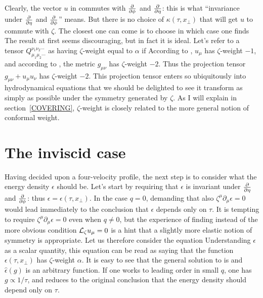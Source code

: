 \documentclass[12pt]{article}
\def\arctanh{\mop{arctanh}}
\begin{document}
Clearly, the vector $u$ in  commutes with ${\partial \over \partial\phi}$ and ${\partial \over \partial\eta}$: this is what ``invariance under ${\partial \over \partial\eta}$ and ${\partial \over \partial\phi}$'' means.  But there is no choice of $\kappa(\tau,x_\perp)$ that will get $u$ to commute with $\zeta$.  The closest one can come is to choose
 \eqn{kappaChoice}{
  \kappa = \arctanh {2q^2 \tau x_\perp \over 1 + q^2 \tau^2 + q^2 x_\perp^2} \,,
 }
in which case one finds
The result  at first seems discouraging, but in fact it is ideal.  Let's refer to a tensor $Q_{\mu_1\mu_2\cdots}^{\nu_1\nu_2\cdots}$ as having $\zeta$-weight equal to $\alpha$ if
According to , $u_\mu$ has $\zeta$-weight $-1$, and according to , the metric $g_{\mu\nu}$ has $\zeta$-weight $-2$.  Thus the projection tensor $g_{\mu\nu} + u_\mu u_\nu$ has $\zeta$-weight $-2$.  This projection tensor enters so ubiquitously into hydrodynamical equations that we should be delighted to see it transform as simply as possible under the symmetry generated by $\zeta$.  As I will explain in section~\ref{COVERING}, $\zeta$-weight is closely related to the more general notion of conformal weight.



\section{The inviscid case}
\label{INVISCID}

Having decided upon a four-velocity profile, the next step is to consider what the energy density $\epsilon$ should be.  Let's start by requiring that $\epsilon$ is invariant under ${\partial \over \partial\eta}$ and ${\partial \over \partial\phi}$: thus $\epsilon = \epsilon(\tau,x_\perp)$.  In the case $q=0$, demanding that also $\zeta^\mu \partial_\mu \epsilon = 0$ would lead immediately to the conclusion that $\epsilon$ depends only on $\tau$.  It is tempting to require $\zeta^\mu \partial_\mu \epsilon = 0$ even when $q \neq 0$, but the experience of finding  instead of the more obvious condition ${\cal L}_\zeta u_\mu = 0$ is a hint that a slightly more elastic notion of symmetry is appropriate.  Let us therefore consider the equation
Understanding $\epsilon$ as a scalar quantity, this equation can be read as saying that the function $\epsilon(\tau,x_\perp)$ has $\zeta$-weight $\alpha$.  It is easy to see that the general solution to  is
and $\hat\epsilon(g)$ is an arbitrary function.  If one works to leading order in small $q$, one has $g \propto 1/\tau$, and  reduces to the original conclusion that the energy density should depend only on $\tau$.
\end{document}
